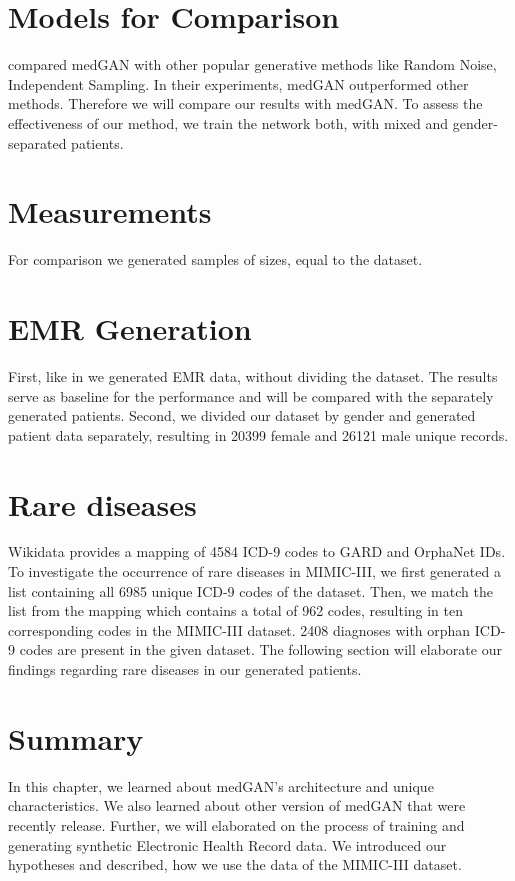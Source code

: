 \documentclass[11pt, a4paper]{book}
\begin{document}
\section{Models for Comparison}
\cite{Choi2017} compared medGAN with other popular generative methods like Random Noise, Independent Sampling. In their experiments, medGAN outperformed other methods. Therefore we will compare our results with medGAN. To assess the effectiveness of our method, we train the network both, with mixed and gender-separated patients. 

\section{Measurements}
For comparison we generated samples of sizes, equal to the dataset.

\section{EMR Generation}
First, like in \cite{Choi2017} we generated EMR data, without dividing the dataset. The results serve as baseline for the performance and will be compared with the separately generated patients.
Second, we divided our dataset by gender and generated patient data separately, resulting in 20399 female and 26121 male unique records.
\\
\section{Rare diseases}
Wikidata provides a mapping of 4584 ICD-9 codes to GARD and OrphaNet IDs.
To investigate the occurrence of rare diseases in MIMIC-III, we first generated a list containing all 6985 unique ICD-9 codes of the dataset. Then, we match the list from the mapping which contains a total of 962 codes, resulting in ten corresponding codes in the MIMIC-III dataset. 2408 diagnoses with orphan ICD-9 codes are present in the given dataset.
The following section will elaborate our findings regarding rare diseases in our generated patients.
\section{Summary}
In this chapter, we learned about medGAN's architecture and unique characteristics. We also learned about other version of medGAN that were recently release. Further, we will elaborated on the process of training and generating synthetic Electronic Health Record data. We introduced our hypotheses and described, how we use the data of the MIMIC-III dataset.
\end{document}
